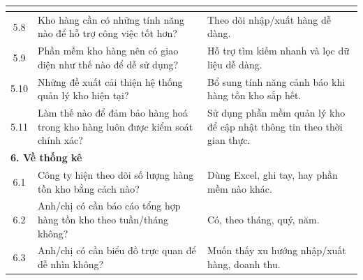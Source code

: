 \documentclass[a4paper,12pt]{report}
\begin{document}
\begin{longtable}{|c|p{8cm}|p{7cm}|}
\begin{itemize}
    \end{itemize}                                                                                                                                                                                                                                                \\
    \hline
    5.8          & Kho hàng cần có những tính năng nào để hỗ trợ công việc tốt hơn?                                                        & Theo dõi nhập/xuất hàng dễ dàng.                                                                                         \\
    \hline
    5.9          & Phần mềm kho hàng nên có giao diện như thế nào để dễ sử dụng?                                                           & Hỗ trợ tìm kiếm nhanh và lọc dữ liệu dễ dàng.                                                                            \\
    \hline
    5.10         & Những đề xuất cải thiện hệ thống quản lý kho hiện tại?                                                                  & Bổ sung tính năng cảnh báo khi hàng tồn kho sắp hết.                                                                     \\
    \hline
    5.11         & Làm thế nào để đảm bảo  hàng hoá trong kho hàng luôn được kiểm soát chính xác?                                          & Sử dụng phần mềm quản lý kho để cập nhật thông tin theo thời gian thực.                                                  \\
    \hline
    \multicolumn{3}{|l|}{\textbf{6. Về thống kê}}                                                                                                                                                                                                                     \\
    \hline
    6.1          & Công ty hiện theo dõi số lượng hàng tồn kho bằng cách nào?                                                              & Dùng Excel, ghi tay, hay phần mềm nào khác.                                                                              \\
    \hline
    6.2          & Anh/chị có cần báo cáo tổng hợp hàng tồn kho theo tuần/tháng không?                                                     & Có, theo tháng, quý, năm.                                                                                                \\
    \hline
    6.3          & Anh/chị có cần biểu đồ trực quan để dễ nhìn không?                                                                      & Muốn thấy xu hướng nhập/xuất hàng, doanh thu.                                                                            \\

\end{longtable}
\end{document}
